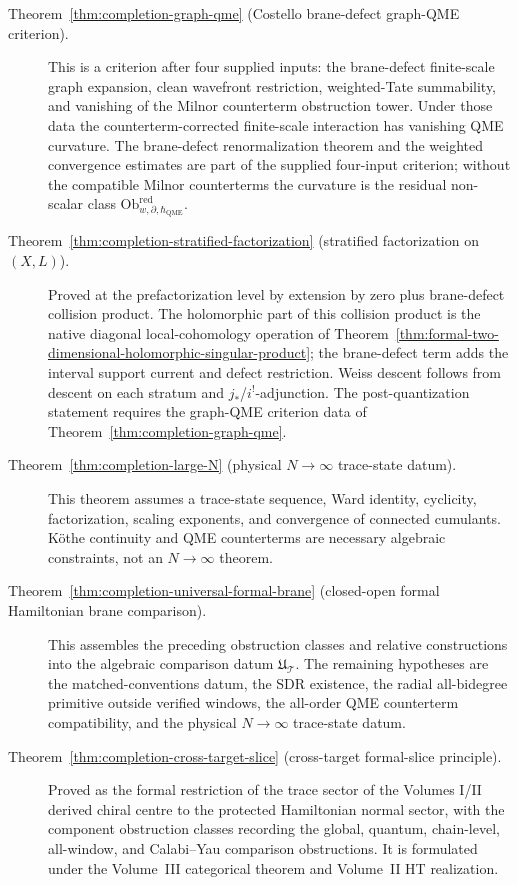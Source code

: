 \begin{description}
\item[Theorem~\ref{thm:completion-graph-qme} (Costello brane-defect
  graph-QME criterion).]  This is a criterion after four supplied
  inputs: the brane-defect finite-scale graph expansion, clean
  wavefront restriction, weighted-Tate summability, and vanishing of the
  Milnor counterterm obstruction tower.  Under those data the
  counterterm-corrected finite-scale interaction has vanishing QME
  curvature.  The brane-defect renormalization theorem and the weighted
  convergence estimates are part of the supplied four-input criterion;
  without the compatible Milnor counterterms the curvature is the
  residual non-scalar class
  \(\mathrm{Ob}^{\mathrm{red}}_{w,\partial,\hbar_{\mathrm{QME}}}\).

\item[Theorem~\ref{thm:completion-stratified-factorization}
  (stratified factorization on \((X,L)\)).]  Proved at the
prefactorization level by extension by zero plus brane-defect
  collision product.  The holomorphic part of this collision product is
  the native diagonal local-cohomology operation of
  Theorem~\ref{thm:formal-two-dimensional-holomorphic-singular-product}; the
  brane-defect term adds the interval support current and defect
  restriction.  Weiss descent follows from descent on each stratum
  and \(j_*\)/\(i^!\)-adjunction.  The post-quantization
  statement requires the graph-QME criterion data of
  Theorem~\ref{thm:completion-graph-qme}.

\item[Theorem~\ref{thm:completion-large-N} (physical \(N\to\infty\) trace-state
  datum).]  This theorem assumes a trace-state sequence, Ward identity,
  cyclicity, factorization, scaling exponents, and convergence of
  connected cumulants.  Köthe continuity and QME counterterms
  are necessary algebraic constraints, not an \(N\to\infty\) theorem.

\item[Theorem~\ref{thm:completion-universal-formal-brane} (closed-open
  formal Hamiltonian brane comparison).]  This assembles
  the preceding obstruction classes and relative constructions
  into the algebraic comparison datum \(\mathfrak U_{\mathcal T}\).  The
  remaining hypotheses are the matched-conventions datum, the SDR
  existence, the radial all-bidegree primitive outside verified
  windows, the all-order QME counterterm compatibility, and the physical
  \(N\to\infty\) trace-state datum.

\item[Theorem~\ref{thm:completion-cross-target-slice} (cross-target
  formal-slice principle).]  Proved as the formal restriction of
  the trace sector of the Volumes I/II derived chiral centre to the
  protected Hamiltonian normal sector, with the component obstruction classes recording
  the global, quantum, chain-level, all-window, and Calabi--Yau
  comparison obstructions.  It is formulated under the Volume~III
  categorical theorem and Volume~II HT realization.
\end{description}


